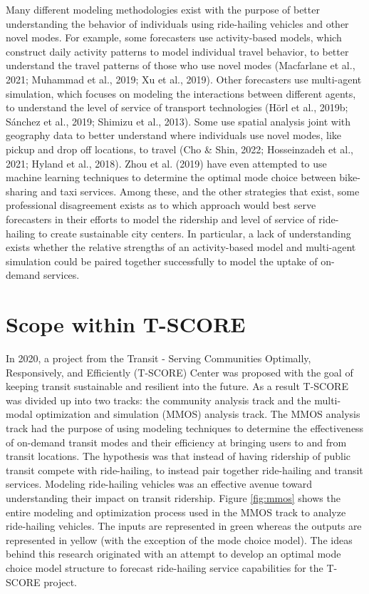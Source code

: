 \documentclass[simple, masters, twoside]{byuthesis}
\begin{document}
Many different modeling methodologies exist with the purpose of better understanding the behavior of individuals using ride-hailing vehicles and other novel modes. For example, some forecasters use activity-based models, which construct daily activity patterns to model individual travel behavior, to better understand the travel patterns of those who use novel modes (Macfarlane et al., 2021; Muhammad et al., 2019; Xu et al., 2019). Other forecasters use multi-agent simulation, which focuses on modeling the interactions between different agents, to understand the level of service of transport technologies (Hörl et al., 2019b; Sánchez et al., 2019; Shimizu et al., 2013). Some use spatial analysis joint with geography data to better understand where individuals use novel modes, like pickup and drop off locations, to travel (Cho \& Shin, 2022; Hosseinzadeh et al., 2021; Hyland et al., 2018). Zhou et al. (2019) have even attempted to use machine learning techniques to determine the optimal mode choice between bike-sharing and taxi services. Among these, and the other strategies that exist, some professional disagreement exists as to which approach would best serve forecasters in their efforts to model the ridership and level of service of ride-hailing to create sustainable city centers. In particular, a lack of understanding exists whether the relative strengths of an activity-based model and multi-agent simulation could be paired together successfully to model the uptake of on-demand services.

\hypertarget{scope-within-t-score}{%
\section{Scope within T-SCORE}\label{scope-within-t-score}}

In 2020, a project from the Transit - Serving Communities Optimally, Responsively, and Efficiently (T-SCORE) Center was proposed with the goal of keeping transit sustainable and resilient into the future. As a result T-SCORE was divided up into two tracks: the community analysis track and the multi-modal optimization and simulation (MMOS) analysis track. The MMOS analysis track had the purpose of using modeling techniques to determine the effectiveness of on-demand transit modes and their efficiency at bringing users to and from transit locations. The hypothesis was that instead of having ridership of public transit compete with ride-hailing, to instead pair together ride-hailing and transit services. Modeling ride-hailing vehicles was an effective avenue toward understanding their impact on transit ridership. Figure \ref{fig:mmos} shows the entire modeling and optimization process used in the MMOS track to analyze ride-hailing vehicles. The inputs are represented in green whereas the outputs are represented in yellow (with the exception of the mode choice model). The ideas behind this research originated with an attempt to develop an optimal mode choice model structure to forecast ride-hailing service capabilities for the T-SCORE project.
\end{document}

